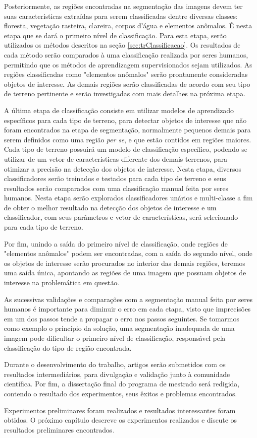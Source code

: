 Posteriormente, as regiões encontradas na segmentação das imagens devem ter suas características extraídas para serem classificadas dentre diversas classes: floresta, vegetação rasteira, clareira, corpos d'água e elementos anômalos. É nesta etapa que se dará o primeiro nível de classificação. Para esta etapa, serão utilizados os métodos descritos na seção \ref{sec:trClassificacao}. Os resultados de cada método serão comparados à uma classificação realizada por seres humanos, permitindo que os métodos de aprendizagem supervisionados sejam utilizados. As regiões classificadas como "elementos anômalos" serão prontamente consideradas objetos de interesse. As demais regiões serão classificadas de acordo com seu tipo de terreno pertinente e serão investigadas com mais detalhes na próxima etapa.

A última etapa de classificação consiste em utilizar modelos de aprendizado específicos para cada tipo de terreno, para detectar objetos de interesse que não foram encontrados na etapa de segmentação, normalmente pequenos demais para serem definidos como uma região \textit{per se}, e que estão contidos em regiões maiores. Cada tipo de terreno possuirá um modelo de classificação específico, podendo se utilizar de um vetor de características diferente dos demais terrenos, para otimizar a precisão na detecção dos objetos de interesse. Nesta etapa, diversos classificadores serão treinados e testados para cada tipo de terreno e seus resultados serão comparados com uma classificação manual feita por seres humanos. Nesta etapa serão explorados classificadores unários e multi-classe a fim de obter o melhor resultado na detecção dos objetos de interesse e um classificador, com seus parâmetros e vetor de características, será selecionado para cada tipo de terreno.

Por fim, unindo a saída do primeiro nível de classificação, onde regiões de "elementos anômalos" podem ser encontradas, com a saída do segundo nível, onde os objetos de interesse serão procurados no interior das demais regiões, teremos uma saída única, apontando as regiões de uma imagem que possuam objetos de interesse na problemática em questão.

As sucessivas validações e comparações com a segmentação manual feita por seres humanos é importante para diminuir o erro em cada etapa, visto que imprecisões em um dos passos tende a propagar o erro nos passos seguintes. Se tomarmos como exemplo o princípio da solução, uma segmentação inadequada de uma imagem pode dificultar o primeiro nível de classificação, responsável pela classificação do tipo de região encontrada.

Durante o desenvolvimento do trabalho, artigos serão submetidos com os resultados intermediários, para divulgação e validação junto à comunidade científica. Por fim, a dissertação final do programa de mestrado será redigida, contendo o resultado dos experimentos, seus êxitos e problemas encontrados.

Experimentos preliminares foram realizados e resultados interessantes foram obtidos. O próximo capítulo descreve os experimentos realizados e discute os resultados preliminares encontrados.